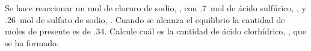 Se hace reaccionar un mol de cloruro de sodio, , con \SI{,7}{\mol} de ácido sulfúrico, , y \SI{,26}{\mol} de sulfato de sodio, . Cuando se alcanza el equilibrio la cantidad de moles de  presente es de \num{,34}. Calcule cuál es la cantidad de ácido clorhídrico, , que se ha formado.

